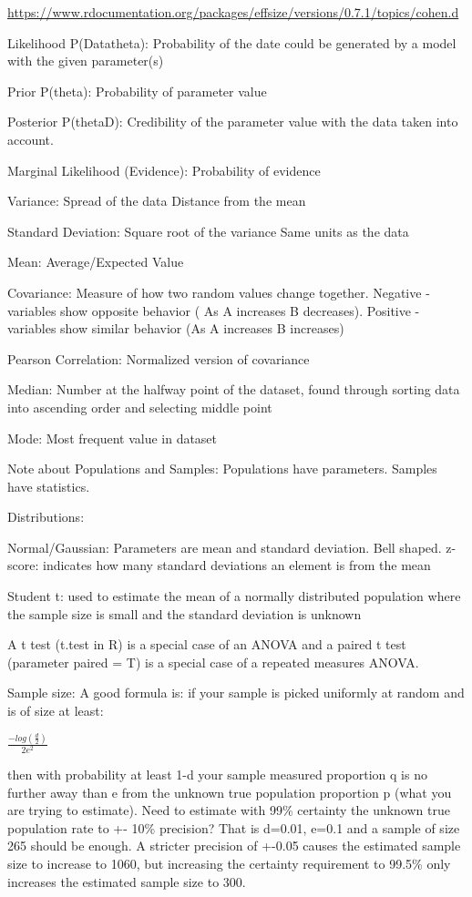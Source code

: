 \documentclass[]{book}
\begin{document}
\url{https://www.rdocumentation.org/packages/effsize/versions/0.7.1/topics/cohen.d}

Likelihood P(Data\textbar{}theta): Probability of the date could be
generated by a model with the given parameter(s)

Prior P(theta): Probability of parameter value

Posterior P(theta\textbar{}D): Credibility of the parameter value with
the data taken into account.

Marginal Likelihood (Evidence): Probability of evidence

Variance: Spread of the data \textbar{} Distance from the mean

Standard Deviation: Square root of the variance \textbar{} Same units as
the data

Mean: Average/Expected Value

Covariance: Measure of how two random values change together. Negative -
variables show opposite behavior ( As A increases B decreases). Positive
- variables show similar behavior (As A increases B increases)

Pearson Correlation: Normalized version of covariance

Median: Number at the halfway point of the dataset, found through
sorting data into ascending order and selecting middle point

Mode: Most frequent value in dataset

Note about Populations and Samples: Populations have parameters. Samples
have statistics.

Distributions:

Normal/Gaussian: Parameters are mean and standard deviation. Bell
shaped. z-score: indicates how many standard deviations an element is
from the mean

Student t: used to estimate the mean of a normally distributed
population where the sample size is small and the standard deviation is
unknown

A t test (t.test in R) is a special case of an ANOVA and a paired t test
(parameter paired = T) is a special case of a repeated measures ANOVA.

Sample size: A good formula is: if your sample is picked uniformly at
random and is of size at least:

\(\frac{-log(\frac{d}{2})}{2e^2}\)

then with probability at least 1-d your sample measured proportion q is
no further away than e from the unknown true population proportion p
(what you are trying to estimate). Need to estimate with 99\% certainty
the unknown true population rate to +- 10\% precision? That is d=0.01,
e=0.1 and a sample of size 265 should be enough. A stricter precision of
+-0.05 causes the estimated sample size to increase to 1060, but
increasing the certainty requirement to 99.5\% only increases the
estimated sample size to 300.
\end{document}
